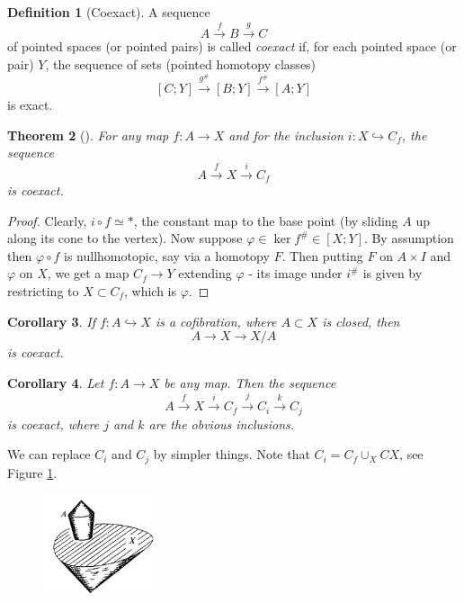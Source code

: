 \documentclass[reqno]{amsart}
\newtheorem{theorem}{Theorem}[section]
\newtheorem{corollary}[theorem]{Corollary}
\theoremstyle{definition}
\newtheorem{definition}[theorem]{Definition}
\theoremstyle{remark}
\begin{document}
    

\begin{definition}[Coexact]
    A sequence
    \[
    A \stackrel{f}{\to} B \stackrel{g}{\to} C
    \] 
    of pointed spaces (or pointed pairs) is called
    \textit{coexact} if, for each pointed space
    (or pair) $Y$, the sequence of sets 
    (pointed homotopy classes)
    \[
    \left[ C;Y \right] 
    \stackrel{g^{\#}}{\to} 
    \left[ B;Y \right] 
    \stackrel{f^{\#}}{\to} 
    \left[ A;Y \right] 
    \] 
    is exact.
\end{definition}

\begin{theorem}[]
    For any map $f \colon A \to X$ and for the
    inclusion $i \colon X \hookrightarrow C_f$, the
    sequence
    \[
    A \stackrel{f}{\to} X \stackrel{i}{\to} C_f
    \] 
    is coexact.
\end{theorem}

\begin{proof}
    Clearly, $i \circ f \simeq *$, the constant map
    to the base point (by sliding $A$ up
    along its cone to the vertex).
    Now suppose $\varphi 
    \in \ker f^{\#} \in 
    \left[ X;Y \right] $. By assumption then
    $\varphi \circ f$ is nullhomotopic,
    say via a homotopy $F$.
    Then putting $F$ on $A \times I$ and
    $\varphi $ on $X$, we get a map
    $C_f \to Y$ extending $\varphi $ - its
    image under $i^{\#}$ is given by restricting
    to $X \subset C_f$, which is $\varphi $.
\end{proof}

\begin{corollary}
    If $f \colon A \hookrightarrow X$ is a cofibration, where
    $A \subset X$ is closed, then
     \[
         A \to X \to X / A
     \] 
     is coexact.
\end{corollary}

\begin{corollary}
    Let $f \colon A \to X$ be any map. Then the sequence
    \[
    A \stackrel{f}{\to} X \stackrel{i}{\to} C_f
    \stackrel{j}{\to} C_i \stackrel{k}{\to} C_j
    \] 
    is coexact, where
    $j$ and $k$ are the obvious inclusions.
\end{corollary}

We can replace $C_i$ and $C_j$ by simpler things.
Note that $C_i = C_f \cup_X CX$, see Figure
\ref{fig:Figures-Cf-cone-png}.

\begin{figure}[htpb]
    \centering
    \includegraphics[width=0.3\textwidth]{Figures/Cf-cone.png}
    \caption{}
    \label{fig:Figures-Cf-cone-png}
\end{figure}
\end{document}
